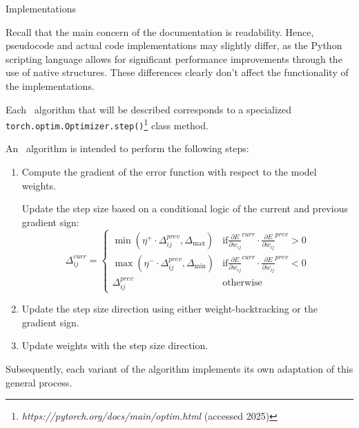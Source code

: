 \begin{section}{Implementations}
    \label{sec:implementations}
    \par Recall that the main concern of the documentation is readability. Hence, pseudocode and actual code implementations may slightly differ, as the Python scripting language allows for significant performance improvements through the use of native structures. These differences clearly don't affect the functionality of the implementations.
    \par Each~ algorithm that will be described corresponds to a specialized\\\texttt{torch.optim.Optimizer.step()}\footnote{\textit{https://pytorch.org/docs/main/optim.html} (accessed 2025)} class method.\\
    \par An~ algorithm is intended to perform the following steps:
    \begin{enumerate}
        \item Compute the gradient of the error function with respect to the model weights.
        \begin{item}
            Update the step size based on a conditional logic of the current and previous gradient sign:
            \[
                \Delta_{ij}^{curr} =
                \begin{cases}
                    \min(\eta^{+} \cdot \Delta_{ij}^{prev}, \Delta_{\max}) & \text{if} {\frac{\partial E}{\partial w_{ij}}}^{curr} \cdot {\frac{\partial E}{\partial w_{ij}}}^{prev} > 0 \\[2ex]
                    \max(\eta^{-} \cdot \Delta_{ij}^{prev}, \Delta_{\min}) & \text{if} {\frac{\partial E}{\partial w_{ij}}}^{curr} \cdot {\frac{\partial E}{\partial w_{ij}}}^{prev} < 0 \\[2ex]
                    \Delta_{ij}^{prev} & \text{otherwise}
                \end{cases}
            \]
        \end{item}
        \item Update the step size direction using either weight-backtracking or the gradient sign.
        \item Update weights with the step size direction.
    \end{enumerate}
    Subsequently, each variant of the algorithm implements its own adaptation of this general process.
    \clearpage
    
    
    
    
\end{section}